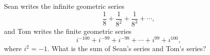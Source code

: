 Sean writes the infinite geometric series
\[
\dfrac{1}{8}+\dfrac{1}{8^2}+\dfrac{1}{8^3}+\cdots ,
\]
and Tom writes the finite geometric series
\[
i^{-100}+i^{-99}+i^{-98}+\cdots+i^{99}+i^{100},
\]
where $i^2=-1$. What is the sum of Sean's series and Tom's series?
